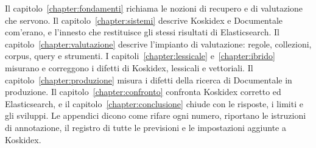 Il capitolo~\ref{chapter:fondamenti} richiama le nozioni di recupero e di
valutazione che servono. Il capitolo~\ref{chapter:sistemi} descrive Koskidex e
Documentale com'erano, e l'innesto che restituisce gli stessi risultati di
Elasticsearch. Il capitolo~\ref{chapter:valutazione} descrive l'impianto di
valutazione: regole, collezioni, corpus, query e strumenti. I
capitoli~\ref{chapter:lessicale} e~\ref{chapter:ibrido} misurano e correggono i
difetti di Koskidex, lessicali e vettoriali. Il capitolo~\ref{chapter:produzione}
misura i difetti della ricerca di Documentale in produzione. Il
capitolo~\ref{chapter:confronto} confronta Koskidex corretto ed Elasticsearch, e
il capitolo~\ref{chapter:conclusione} chiude con le risposte, i limiti e gli
sviluppi. Le appendici dicono come rifare ogni numero, riportano le istruzioni di
annotazione, il registro di tutte le previsioni e le impostazioni aggiunte a
Koskidex.
